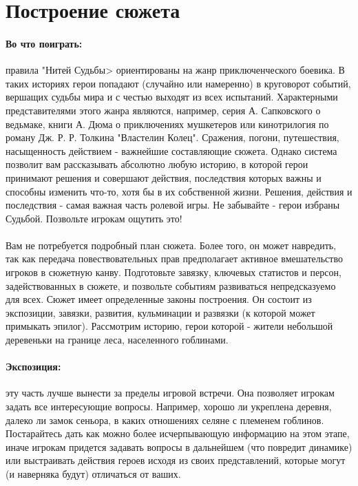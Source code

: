 \section{Построение сюжета}
\paragraph{Во что поиграть:} правила "Нитей Судьбы> ориентированы на жанр приключенческого боевика. В таких историях герои попадают (случайно или намеренно) в круговорот событий, вершащих судьбы мира и с честью выходят из всех испытаний. Характерными представителями этого жанра являются, например, серия А. Сапковского о ведьмаке, книги А. Дюма о приключениях мушкетеров или кинотрилогия по роману Дж. Р. Р. Толкина "Властелин Колец". Сражения, погони, путешествия, насыщенность действием - важнейшие составляющие сюжета. Однако система позволит вам рассказывать абсолютно любую историю, в которой герои принимают решения и совершают действия, последствия которых важны и способны изменить что-то, хотя бы в их собственной жизни. Решения, действия и последствия - самая важная часть ролевой игры. Не забывайте - герои избраны Судьбой. Позвольте игрокам ощутить это!
\paragraph{}
Вам не потребуется подробный план сюжета. Более того, он может навредить, так как передача повествовательных прав предполагает активное вмешательство игроков в сюжетную канву. Подготовьте завязку, ключевых статистов и персон, задействованных в сюжете, и позвольте событиям развиваться непредсказуемо для всех. Сюжет имеет определенные законы построения. Он состоит из экспозиции, завязки, развития, кульминации и развязки (к которой может примыкать эпилог). Рассмотрим историю, герои которой - жители небольшой деревеньки на границе леса, населенного гоблинами.
\paragraph{Экспозиция:} эту часть лучше вынести за пределы игровой встречи. Она позволяет игрокам задать все интересующие вопросы. Например, хорошо ли укреплена деревня, далеко ли замок сеньора, в каких отношениях селяне с племенем гоблинов. Постарайтесь дать как можно более исчерпывающую информацию на этом этапе, иначе игрокам придется задавать вопросы в дальнейшем (что повредит динамике) или выстраивать действия героев исходя из своих представлений, которые могут (и наверняка будут) отличаться от ваших.
